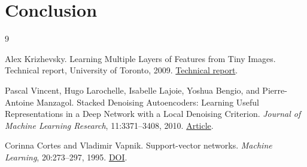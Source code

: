 \documentclass[10pt,twocolumn,letterpaper]{article}
\begin{document}
\section{Conclusion}
\Conclusions{}

\begin{thebibliography}{9}

Alex Krizhevsky.
\newblock Learning Multiple Layers of Features from Tiny Images.
\newblock Technical report, University of Toronto, 2009.
\newblock
\href{https://www.cs.toronto.edu/~kriz/learning-features-2009-TR.pdf}
{Technical report}.

Pascal Vincent, Hugo Larochelle, Isabelle Lajoie, Yoshua Bengio,
and Pierre-Antoine Manzagol.
\newblock Stacked Denoising Autoencoders: Learning Useful Representations
in a Deep Network with a Local Denoising Criterion.
\newblock \emph{Journal of Machine Learning Research}, 11:3371--3408, 2010.
\newblock
\href{https://www.jmlr.org/papers/v11/vincent10a.html}{Article}.

Corinna Cortes and Vladimir Vapnik.
\newblock Support-vector networks.
\newblock \emph{Machine Learning}, 20:273--297, 1995.
\newblock
\href{https://doi.org/10.1007/BF00994018}{DOI}.

\end{thebibliography}
\end{document}
